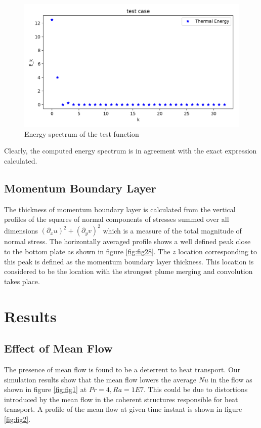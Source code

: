 \documentclass[12pt]{article}
\begin{document}
    \begin{figure}[!htb]
    	\includegraphics[width=\linewidth]{test2.png}
    	\caption{Energy spectrum of the test function}
    	\label{fig:t2}
    \end{figure}
    
    Clearly, the computed energy spectrum is in agreement with the exact expression calculated.
    
    
    \subsection{Momentum Boundary Layer}
    
    The thickness of momentum boundary layer is calculated from the vertical profiles of the squares of normal components of stresses summed over all dimensions $(\partial_x u)^2 + (\partial_y v)^2$ which is a measure of the total magnitude of normal stress. The horizontally averaged profile shows a well defined peak close to the bottom plate as shown in figure \ref{fig:fig28}. The $z$ location corresponding to this peak is defined as the momentum boundary layer thickness. This location is considered to be the location with the strongest plume merging and convolution takes place.
    
    
     \section{Results}
     \subsection{Effect of Mean Flow}
     The presence of mean flow is found to be a deterrent to heat transport. Our simulation results show that the mean flow lowers the average $Nu$ in the flow as shown in figure \ref{fig:fig1} at $Pr = 4, Ra = 1E7$. This could be due to distortions introduced by the mean flow in the coherent structures responsible for heat transport. A profile of the mean flow at given time instant is shown in figure \ref{fig:fig2}.
     
\end{document}
